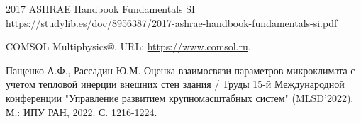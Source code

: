 \documentclass[a4paper,article,14pt]{extarticle}
\begin{document}


\tableofcontents
\pagebreak










\newpage
\begin{thebibliography}{1}
 2017 ASHRAE Handbook Fundamentals SI \\
\url{https://studylib.es/doc/8956387/2017-ashrae-handbook-fundamentals-si.pdf}

 COMSOL Multiphysics®﻿. URL: \url{https://www.comsol.ru}.

 Пащенко А.Ф., Рассадин Ю.М. Оценка взаимосвязи параметров микроклимата с учетом тепловой инерции внешних стен здания / Труды 15-й Международной конференции "Управление развитием крупномасштабных систем" (MLSD’2022). М.: ИПУ РАН, 2022. С. 1216-1224.


\end{thebibliography}
\end{document}
